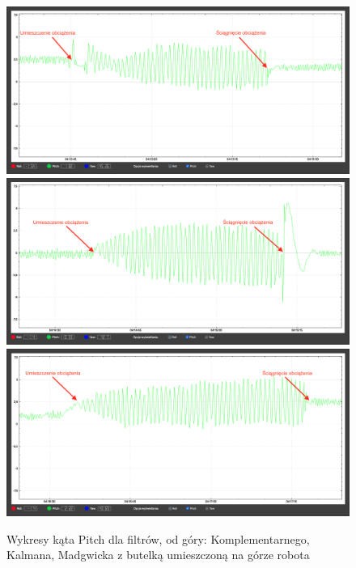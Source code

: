 \begin{figure}[h!]
    \centering
    \includegraphics[width=1\textwidth]{Rysunki/Rozdzial07/Komplementarny_butelka.png}
    \includegraphics[width=1\textwidth]{Rysunki/Rozdzial07/Kalman_butelka.png}
    \includegraphics[width=1\textwidth]{Rysunki/Rozdzial07/Madgwick_butelka.png}
    \caption{Wykresy kąta Pitch dla filtrów, od góry: Komplementarnego, Kalmana, Madgwicka z butelką umieszczoną na górze robota}
    \label{Z butelka wykresy}
\end{figure}

